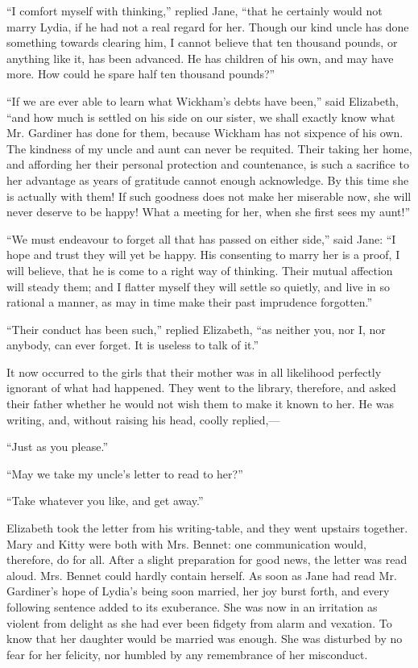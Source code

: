 \documentclass[12pt]{book}
\begin{document}
``I comfort myself with thinking,'' replied Jane, ``that he certainly would not marry Lydia, if he had not a real regard for her. Though our kind uncle has done something towards clearing him, I cannot believe that ten thousand pounds, or anything like it, has been advanced. He has children of his own, and may have more. How could he spare half ten thousand pounds?''

``If we are ever able to learn what Wickham's debts have been,'' said Elizabeth, ``and how much is settled on his side on our sister, we shall exactly know what Mr. Gardiner has done for them, because Wickham has not sixpence of his own. The kindness of my uncle and aunt can never be requited. Their taking her home, and affording her their personal protection and countenance, is such a sacrifice to her advantage as years of gratitude cannot enough acknowledge. By this time she is actually with them! If such goodness does not make her miserable now, she will never deserve to be happy! What a meeting for her, when she first sees my aunt!''

``We must endeavour to forget all that has passed on either side,'' said Jane: ``I hope and trust they will yet be happy. His consenting to marry her is a proof, I will believe, that he is come to a right way of thinking. Their mutual affection will steady them; and I flatter myself they will settle so quietly, and live in so rational a manner, as may in time make their past imprudence forgotten.''

``Their conduct has been such,'' replied Elizabeth, ``as neither you, nor I, nor anybody, can ever forget. It is useless to talk of it.''

It now occurred to the girls that their mother was in all likelihood perfectly ignorant of what had happened. They went to the library, therefore, and asked their father whether he would not wish them to make it known to her. He was writing, and, without raising his head, coolly replied,---

``Just as you please.''

``May we take my uncle's letter to read to her?''

``Take whatever you like, and get away.''

Elizabeth took the letter from his writing-table, and they went upstairs together. Mary and Kitty were both with Mrs. Bennet: one communication would, therefore, do for all. After a slight preparation for good news, the letter was read aloud. Mrs. Bennet could hardly contain herself. As soon as Jane had read Mr. Gardiner's hope of Lydia's being soon married, her joy burst forth, and every following sentence added to its exuberance. She was now in an irritation as violent from delight as she had ever been fidgety from alarm and vexation. To know that her daughter would be married was enough. She was disturbed by no fear for her felicity, nor humbled by any remembrance of her misconduct.
\end{document}
